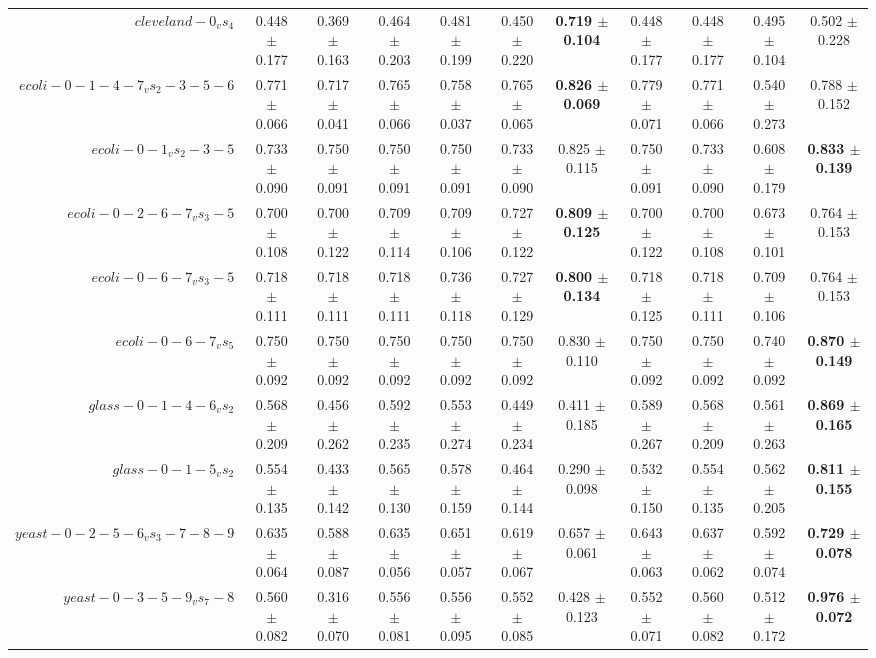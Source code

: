 \begin{table}[!ht]
{\begin{tabular}{r c c c c c c c c c c}
$cleveland-0_vs_4$ & 0.448 $\pm$ 0.177 & 0.369 $\pm$ 0.163 & 0.464 $\pm$ 0.203 & 0.481 $\pm$ 0.199 & 0.450 $\pm$ 0.220 & \textbf{0.719 $\pm$ 0.104} & 0.448 $\pm$ 0.177 & 0.448 $\pm$ 0.177 & 0.495 $\pm$ 0.104 & 0.502 $\pm$ 0.228 \\
$ecoli-0-1-4-7_vs_2-3-5-6$ & 0.771 $\pm$ 0.066 & 0.717 $\pm$ 0.041 & 0.765 $\pm$ 0.066 & 0.758 $\pm$ 0.037 & 0.765 $\pm$ 0.065 & \textbf{0.826 $\pm$ 0.069} & 0.779 $\pm$ 0.071 & 0.771 $\pm$ 0.066 & 0.540 $\pm$ 0.273 & 0.788 $\pm$ 0.152 \\
$ecoli-0-1_vs_2-3-5$ & 0.733 $\pm$ 0.090 & 0.750 $\pm$ 0.091 & 0.750 $\pm$ 0.091 & 0.750 $\pm$ 0.091 & 0.733 $\pm$ 0.090 & 0.825 $\pm$ 0.115 & 0.750 $\pm$ 0.091 & 0.733 $\pm$ 0.090 & 0.608 $\pm$ 0.179 & \textbf{0.833 $\pm$ 0.139} \\
$ecoli-0-2-6-7_vs_3-5$ & 0.700 $\pm$ 0.108 & 0.700 $\pm$ 0.122 & 0.709 $\pm$ 0.114 & 0.709 $\pm$ 0.106 & 0.727 $\pm$ 0.122 & \textbf{0.809 $\pm$ 0.125} & 0.700 $\pm$ 0.122 & 0.700 $\pm$ 0.108 & 0.673 $\pm$ 0.101 & 0.764 $\pm$ 0.153 \\
$ecoli-0-6-7_vs_3-5$ & 0.718 $\pm$ 0.111 & 0.718 $\pm$ 0.111 & 0.718 $\pm$ 0.111 & 0.736 $\pm$ 0.118 & 0.727 $\pm$ 0.129 & \textbf{0.800 $\pm$ 0.134} & 0.718 $\pm$ 0.125 & 0.718 $\pm$ 0.111 & 0.709 $\pm$ 0.106 & 0.764 $\pm$ 0.153 \\
$ecoli-0-6-7_vs_5$ & 0.750 $\pm$ 0.092 & 0.750 $\pm$ 0.092 & 0.750 $\pm$ 0.092 & 0.750 $\pm$ 0.092 & 0.750 $\pm$ 0.092 & 0.830 $\pm$ 0.110 & 0.750 $\pm$ 0.092 & 0.750 $\pm$ 0.092 & 0.740 $\pm$ 0.092 & \textbf{0.870 $\pm$ 0.149} \\
$glass-0-1-4-6_vs_2$ & 0.568 $\pm$ 0.209 & 0.456 $\pm$ 0.262 & 0.592 $\pm$ 0.235 & 0.553 $\pm$ 0.274 & 0.449 $\pm$ 0.234 & 0.411 $\pm$ 0.185 & 0.589 $\pm$ 0.267 & 0.568 $\pm$ 0.209 & 0.561 $\pm$ 0.263 & \textbf{0.869 $\pm$ 0.165} \\
$glass-0-1-5_vs_2$ & 0.554 $\pm$ 0.135 & 0.433 $\pm$ 0.142 & 0.565 $\pm$ 0.130 & 0.578 $\pm$ 0.159 & 0.464 $\pm$ 0.144 & 0.290 $\pm$ 0.098 & 0.532 $\pm$ 0.150 & 0.554 $\pm$ 0.135 & 0.562 $\pm$ 0.205 & \textbf{0.811 $\pm$ 0.155} \\
$yeast-0-2-5-6_vs_3-7-8-9$ & 0.635 $\pm$ 0.064 & 0.588 $\pm$ 0.087 & 0.635 $\pm$ 0.056 & 0.651 $\pm$ 0.057 & 0.619 $\pm$ 0.067 & 0.657 $\pm$ 0.061 & 0.643 $\pm$ 0.063 & 0.637 $\pm$ 0.062 & 0.592 $\pm$ 0.074 & \textbf{0.729 $\pm$ 0.078} \\
$yeast-0-3-5-9_vs_7-8$ & 0.560 $\pm$ 0.082 & 0.316 $\pm$ 0.070 & 0.556 $\pm$ 0.081 & 0.556 $\pm$ 0.095 & 0.552 $\pm$ 0.085 & 0.428 $\pm$ 0.123 & 0.552 $\pm$ 0.071 & 0.560 $\pm$ 0.082 & 0.512 $\pm$ 0.172 & \textbf{0.976 $\pm$ 0.072} \\

\end{tabular}}
\end{table}
